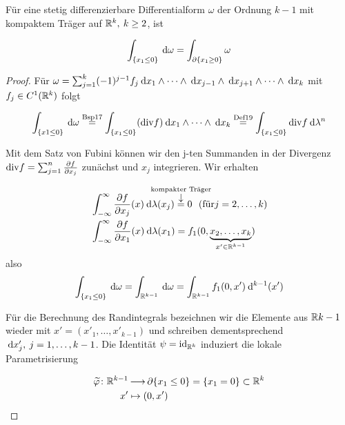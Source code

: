 \documentclass[skript.tex]{subfiles}
\begin{document}
			\begin{lem}
				Für eine stetig differenzierbare Differentialform $\omega$ der Ordnung $k-1$ mit kompaktem Träger auf $\mathbb{R}^k, \: k\geq 2$, ist
				
				\begin{equation*}
				\int_{\{x_1 \leq 0\}} \: \mathrm{d} \omega = \int_{ \partial \{x_1 \geq 0\}} \omega
				\end{equation*}
				
				\begin{proof}
					Für $\omega = \sum_{j =1}^{k}(-1)^{j-1} f_j \: \mathrm{d} x_1 \wedge \dots \wedge \: \mathrm{d} x_{j-1} \wedge \: \mathrm{d} x_{j+1} \wedge \dots \wedge \: \mathrm{d} x_k $ mit $f_j \in C^1 (\mathbb{R}^k)$ folgt
					
					\begin{equation*}
					 \int_{\{x1 \leq 0\}} \: \mathrm{d} \omega \overset{\text{Bsp} 17}{=} \int_{\{x_1 \leq 0\}}(\text{div} f) \: \mathrm{d} x_1 \wedge \dots \wedge \: \mathrm{d} x_k \overset{\text{Def} 19}{=}  \int_{\{x_1 \leq 0\}} \text{div} f \: \mathrm{d} \lambda^n
					 \end{equation*}
					
					Mit dem Satz von Fubini können wir den j-ten Summanden in der Divergenz $\text{div} f = \sum_{j=1}^{n} \frac{\partial f}{\partial x_j}$ zunächst und $x_j$ integrieren. Wir erhalten
					
					\begin{align*}
					&\int_{-\infty}^{\infty} \frac{\del f}{\del x_j}(x) \md \lambda (x_j) \darrow{\text{kompakter Träger}}{=}0 \: \: \: (\text{für} j=2, \dots, k) \\ 
					& \int_{-\infty}^{\infty} \frac{\del f}{\del x_1}(x) \md \lambda (x_1) = f_1 (0, \underbrace{x_2, \dots, x_k}_{x' \in \R^{k-1}})
					\end{align*}
					also
					\begin{equation*}
					\int_{\{x_1 \leq 0\}} \: \mathrm{d} \omega = \int_{\mathbb{R}^{k-1}} \: \mathrm{d} \omega = \int_{\mathbb{R}^{k-1}}	f_1 (0,x') \: \mathrm{d}^{k-1} (x')
					\end{equation*}
					
					Für die Berechnung des Randintegrals bezeichnen wir die Elemente aus $\mathbb{R}{k-1}$ wieder mit $x' = (x'_1, \dots, x'_{k-1})$ und schreiben dementsprechend $\: \mathrm{d} x'_j, \: j=1, \dots, k-1$. Die Identität $\psi = \mathrm{id}_{\mathbb{R}^k}$ induziert die lokale Parametrisierung
					
					\begin{align*}
					\widetilde{\varphi} \colon \mathbb{R}^{k-1} &\kern -1pt \longrightarrow \kern -1pt  \partial \{x_1 \leq 0\} = \{x_1 = 0\} \subset \mathbb{R}^k \\  x' &\mapsto (0, x')
					\end{align*}
					

\end{proof}
\end{lem}
\end{document}
